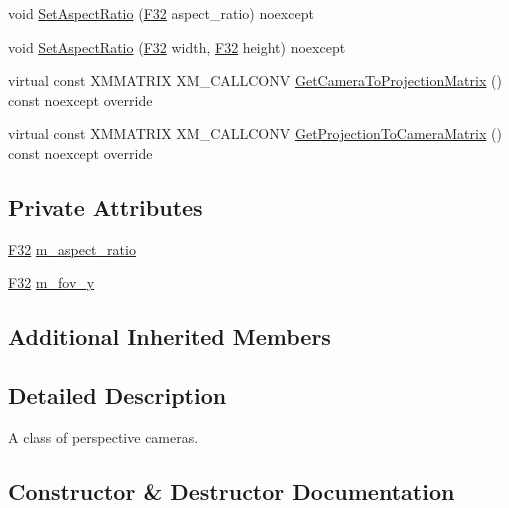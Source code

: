 \begin{DoxyCompactItemize}
\item 
void \hyperlink{classmage_1_1rendering_1_1_perspective_camera_a180f74e8b39609aee8dcc2741a74076f}{Set\+Aspect\+Ratio} (\hyperlink{namespacemage_aa97e833b45f06d60a0a9c4fc22ae02c0}{F32} aspect\+\_\+ratio) noexcept
\item 
void \hyperlink{classmage_1_1rendering_1_1_perspective_camera_a09a93f5281723ec6ccf1adf636619e60}{Set\+Aspect\+Ratio} (\hyperlink{namespacemage_aa97e833b45f06d60a0a9c4fc22ae02c0}{F32} width, \hyperlink{namespacemage_aa97e833b45f06d60a0a9c4fc22ae02c0}{F32} height) noexcept
\item 
virtual const X\+M\+M\+A\+T\+R\+IX X\+M\+\_\+\+C\+A\+L\+L\+C\+O\+NV \hyperlink{classmage_1_1rendering_1_1_perspective_camera_af0892905a0030fc70bdc629007cde5a0}{Get\+Camera\+To\+Projection\+Matrix} () const noexcept override
\item 
virtual const X\+M\+M\+A\+T\+R\+IX X\+M\+\_\+\+C\+A\+L\+L\+C\+O\+NV \hyperlink{classmage_1_1rendering_1_1_perspective_camera_af049c6330ebdaa822bfd31dc88f25ac2}{Get\+Projection\+To\+Camera\+Matrix} () const noexcept override
\end{DoxyCompactItemize}
\subsection*{Private Attributes}
\begin{DoxyCompactItemize}
\item 
\hyperlink{namespacemage_aa97e833b45f06d60a0a9c4fc22ae02c0}{F32} \hyperlink{classmage_1_1rendering_1_1_perspective_camera_a28abd925a9694954dcd26a4c16b6ac6d}{m\+\_\+aspect\+\_\+ratio}
\item 
\hyperlink{namespacemage_aa97e833b45f06d60a0a9c4fc22ae02c0}{F32} \hyperlink{classmage_1_1rendering_1_1_perspective_camera_afa70744921fce139d518730f998bd566}{m\+\_\+fov\+\_\+y}
\end{DoxyCompactItemize}
\subsection*{Additional Inherited Members}


\subsection{Detailed Description}
A class of perspective cameras. 

\subsection{Constructor \& Destructor Documentation}
\hypertarget{classmage_1_1rendering_1_1_perspective_camera_ab478643eb5a2285d330b228287cc0187}{}\label{classmage_1_1rendering_1_1_perspective_camera_ab478643eb5a2285d330b228287cc0187} 
